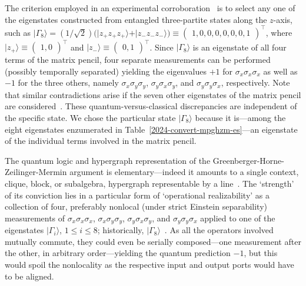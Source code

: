 \documentclass[
  twocolumn,
 showpacs,
 showkeys,
 preprintnumbers,
 amsmath,amssymb,
 aps,
 prl,
  longbibliography,
 floatfix,
 ]{revtex4-2}
\newcommand\myotimes{ }
\begin{document}
The criterion employed in an experimental corroboration~\cite{panbdwz} is to select any one of the eigenstates constructed from entangled three-partite states along the $z$-axis, such as
$\vert \Gamma_8 \rangle = (1/\sqrt{2})\big(\vert z_+z_+z_+ \rangle  + \vert z_-z_-z_- \rangle \big) \equiv \begin{pmatrix}          1, 0, 0, 0, 0, 0, 0, 1            \end{pmatrix}^\intercal $,
where
$\vert z_+ \rangle \equiv  \begin{pmatrix}          1, 0            \end{pmatrix}^\intercal $ and
$\vert z_- \rangle \equiv  \begin{pmatrix}          0, 1            \end{pmatrix}^\intercal $.
Since $\vert \Gamma_8 \rangle$ is an eigenstate of all four terms of the matrix pencil, four separate measurements can be performed (possibly temporally separated) yielding the eigenvalues
$+1$ for
$\sigma_x \myotimes  \sigma_x \myotimes  \sigma_x$
as well as $-1$ for the three others, namely $\sigma_x \myotimes  \sigma_y \myotimes  \sigma_y$, $\sigma_y \myotimes  \sigma_x \myotimes  \sigma_y$, and $\sigma_y \myotimes  \sigma_y \myotimes  \sigma_x$, respectively.
Note that similar contradictions arise if the seven other eigenstates of the matrix pencil are considered~\cite[Table~1]{svozil-2020-ghz}.
These quantum-versus-classical discrepancies are independent of the specific state.
We chose the particular state $\vert \Gamma_8 \rangle$ because it is---among the eight eigenstates
enzumerated in Table~\ref{2024-convert-mpghzm-es}---an eigenstate of the individual terms involved in the matrix pencil.


The quantum logic  and hypergraph representation of the Greenberger-Horne-Zeilinger-Mermin argument is elementary---indeed
it amounts to a single context, clique, block, or subalgebra, hypergraph representable by a line~\cite[Figure~2(a)]{svozil-2020-ghz}.
The `strength' of its conviction lies in a particular form of `operational realizability' as a collection of four,
preferably nonlocal (under strict Einstein separability) measurements of
$\sigma_x \myotimes \sigma_x \myotimes \sigma_x$,
$\sigma_x \myotimes \sigma_y \myotimes \sigma_y$,
$\sigma_y \myotimes \sigma_x \myotimes \sigma_y$, and
$\sigma_y \myotimes \sigma_y \myotimes \sigma_x$
applied to one of the eigenstates $\vert \Gamma_i \rangle$, $1 \le i \le 8$;
historically, $\vert \Gamma_8 \rangle$~\cite{panbdwz}.
As all the operators involved mutually commute, they could even be serially composed---one
measurement after the other, in arbitrary order---yielding the quantum prediction $-1$,
but this would spoil the nonlocality as the respective input and output ports would have to be aligned.
\end{document}
